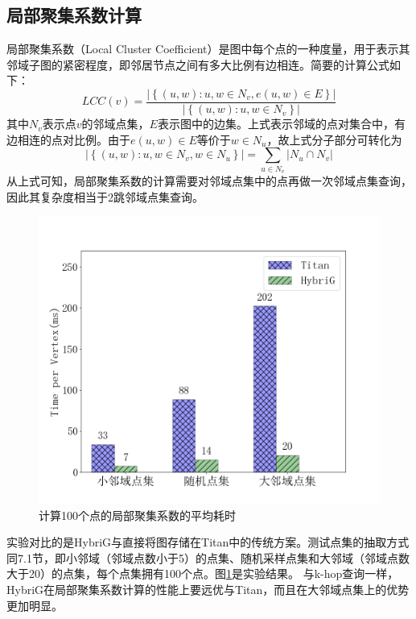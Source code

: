 \subsection{局部聚集系数计算}
局部聚集系数（Local Cluster Coefficient）是图中每个点的一种度量，用于表示其邻域子图的紧密程度，即邻居节点之间有多大比例有边相连。简要的计算公式如下：
$$LCC(v) = \frac{\left | \left \{(u,w):u,w \in{N_v}, e(u,w)\in{E} \right \} \right |}{\left | \left \{(u,w):u,w\in N_v\right \} \right |}$$
其中$N_v$表示点$v$的邻域点集，$E$表示图中的边集。上式表示邻域的点对集合中，有边相连的点对比例。由于$e(u,w)\in{E}$等价于$w\in{N_u}$，故上式分子部分可转化为
$$\left | \left \{ (u,w):u,w\in{N_v},w\in{N_u} \right \} \right | = \sum_{u\in{N_v}}{\left | N_u \cap N_v  \right |}$$
从上式可知，局部聚集系数的计算需要对邻域点集中的点再做一次邻域点集查询，因此其复杂度相当于2跳邻域点集查询。

\begin{figure}[htbp]
\centering
\includegraphics[width=120mm]{fig/local_cc.png}
\caption{计算100个点的局部聚集系数的平均耗时}
\label{fig:local_cc}
\end{figure}

实验对比的是HybriG与直接将图存储在Titan中的传统方案。测试点集的抽取方式同7.1节，即小邻域（邻域点数小于5）的点集、随机采样点集和大邻域（邻域点数大于20）的点集，每个点集拥有100个点。图\ref{fig:local_cc}是实验结果。
与k-hop查询一样，HybriG在局部聚集系数计算的性能上要远优与Titan，而且在大邻域点集上的优势更加明显。

